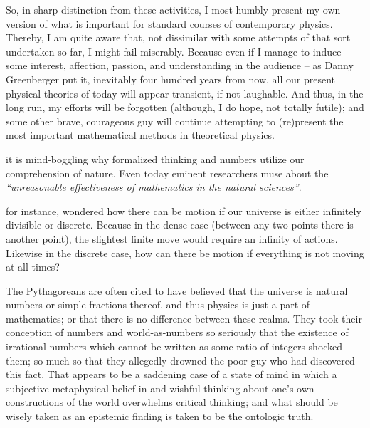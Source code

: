 So, in sharp distinction from these activities,
I most humbly present my own version of what is important for standard courses of contemporary physics.
Thereby, I am quite aware that, not dissimilar with some attempts of that sort undertaken so far, I might fail miserably.
Because even if I manage to induce some interest, affection, passion, and understanding in the audience -- as Danny Greenberger put it,
inevitably
four hundred years from now, all our present physical theories of today will appear transient\cite[-35mm]{lakatosch}, if not laughable.
And thus, in the long run, my efforts will be forgotten (although, I do hope, not totally futile); and some other brave, courageous guy
will continue attempting to (re)present the most important mathematical methods in theoretical physics.



 it is mind-boggling why formalized thinking and numbers utilize our comprehension
of nature.
Even today eminent researchers muse about the {\em
``unreasonable effectiveness of mathematics in the natural sciences''}\cite[-40mm]{wigner}.



 for instance, wondered how there can be motion if
our universe is either infinitely divisible or discrete.
Because in the dense case (between any two points there is another point),
the slightest finite move would require an infinity of actions.
Likewise in the discrete case,
how can there be motion if everything is not moving at all times\cite{zeno,benna:62,gruenbaum:68,Sainsbury}?


The Pythagoreans are often cited to have believed that the universe is natural numbers or simple fractions thereof, and thus physics is just a part of mathematics; or that
there is no difference between these realms.
They took their conception of numbers and world-as-numbers so seriously that the existence of irrational numbers which cannot
be written as some ratio of integers shocked them; so much so that they allegedly drowned the poor guy who had discovered this fact.
That appears to be a saddening case of a state of mind in which a subjective metaphysical belief in and
wishful thinking about one's own constructions of the world overwhelms critical thinking;
and what should be wisely taken as an epistemic finding is taken to be the ontologic truth.


